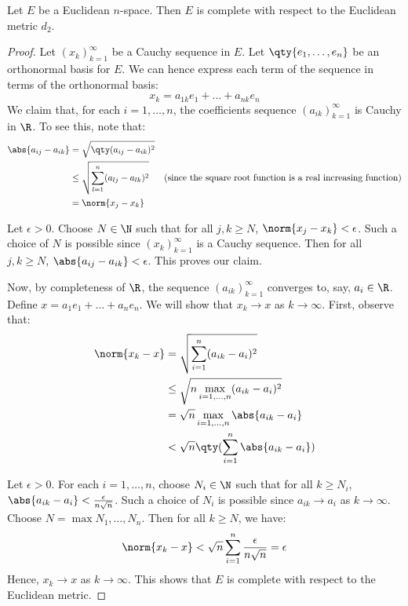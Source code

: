 \begin{theorem}
  Let \( E \) be a Euclidean \( n \)-space. Then \( E \) is complete with respect to the Euclidean metric \( d_2 \).
\end{theorem}
\begin{proof}
  Let \( (x_k)_{k=1}^\infty \) be a Cauchy sequence in \( E \). Let \( \qty{e_1,\dots,e_n} \) be an orthonormal basis for \( E \). We can hence express each term of the sequence in terms of the orthonormal basis:
  \[ x_k=a_{1k}e_1+\dots+a_{nk}e_n \]
  We claim that, for each \( i=1,\dots,n \), the coefficients sequence \( (a_{ik})_{k=1}^\infty \) is Cauchy in \( \R \). To see this, note that:
  \begin{align*}
    \abs{a_{ij}-a_{ik}}&=\sqrt{\qty(a_{ij}-a_{ik})^2}\\
    &\leq \sqrt{\sum_{l=1}^n (a_{lj}-a_{lk})^2} &(\text{since the square root function is a real increasing function})\\
    &= \norm{x_j-x_k}
  \end{align*}

  Let \( \epsilon>0 \). Choose \( N\in\N \) such that for all \( j,k\geq N \), \( \norm{x_j-x_k}<\epsilon \). Such a choice of \( N \) is possible since \( (x_k)_{k=1}^\infty \) is a Cauchy sequence. Then for all \( j,k\geq N \), \( \abs{a_{ij}-a_{ik}}<\epsilon \). This proves our claim.

  \vspace{3mm}

  Now, by completeness of \( \R \), the sequence \( (a_{ik})_{k=1}^\infty \) converges to, say, \( a_i\in\R \). Define \( x=a_1e_1+\dots+a_ne_n \). We will show that \( x_k\to x \) as \(k\to\infty  \). First, observe that:
  \begin{align*}
    \norm{x_k-x}&= \sqrt{\sum_{i=1}^n(a_{ik}-a_i)^2}\\
    &\leq \sqrt{n\max_{i=1,\dots,n}(a_{ik}-a_i)^2}\\
    &= \sqrt{n}\max_{i=1,\dots,n}\abs{a_{ik}-a_i}\\
    &<\sqrt{n}\qty(\sum_{i=1}^n\abs{a_{ik}-a_i})
  \end{align*}

  Let \( \epsilon>0 \). For each \( i=1,\dots,n \), choose \( N_i\in\N \) such that for all \( k\geq N_i \), \( \abs{a_{ik}-a_i}<\frac{\epsilon}{n\sqrt{n}} \). Such a choice of \( N_i \) is possible since \( a_{ik}\to a_i \) as \( k\to\infty \). Choose \( N=\max{N_1,\dots,N_n} \). Then for all \( k\geq N \), we have:
  \[ \norm{x_k-x}<\sqrt{n}\sum_{i=1}^n\frac{\epsilon}{n\sqrt{n}}=\epsilon \]
  Hence, \( x_k\to x \) as \( k\to\infty \). This shows that \( E \) is complete with respect to the Euclidean metric.
\end{proof}

